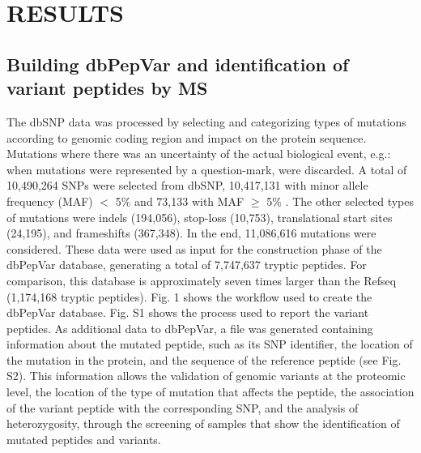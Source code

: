 \documentclass{ieeeaccess}
\begin{document}
\section{RESULTS}

\subsection{Building dbPepVar and identification of variant peptides by MS}

The dbSNP data was processed by selecting and categorizing types of mutations according to genomic coding  region and impact on the protein sequence. Mutations where there was an uncertainty of the actual biological event, e.g.: when mutations were represented by a question-mark, were discarded. A total of 10,490,264 SNPs were selected from dbSNP, 10,417,131 with minor allele frequency (MAF) $<$ 5\% and 73,133 with MAF $\geq$ 5\% \cite{International_HapMap_3_Consortium2010-eo}. The other selected types of mutations were indels (194,056), stop-loss (10,753), translational start sites (24,195), and frameshifts (367,348). In the end, 11,086,616 mutations were considered. These data were used as input for the construction phase of the dbPepVar database, generating a total of 7,747,637 tryptic peptides. For comparison, this database is approximately seven times larger than the Refseq (1,174,168 tryptic peptides). Fig. 1 shows the workflow used to create the dbPepVar database. Fig. S1 shows the process used to report the variant peptides. As additional data to dbPepVar, a file was generated containing information about the mutated peptide, such as its SNP identifier, the location of the mutation in the protein, and the sequence of the reference peptide (see Fig. S2). This information allows the validation of genomic variants at the proteomic level, the location of the type of mutation that affects the peptide, the association of the variant peptide with the corresponding SNP, and the analysis of heterozygosity, through the screening of samples that show the identification of mutated peptides and variants. 
\end{document}
